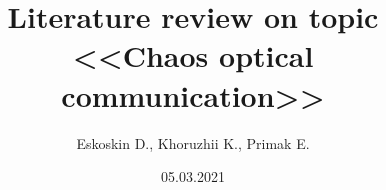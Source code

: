\documentclass[]{beamer}
\title[Optical chaos]{Literature review on topic \\ <<Chaos optical communication>>}
\author{Eskoskin D., Khoruzhii K., Primak E.}
\institute[MIPT]
\begin{document}
\date{05.03.2021}

% 

% 
% 
% 


\end{document}
